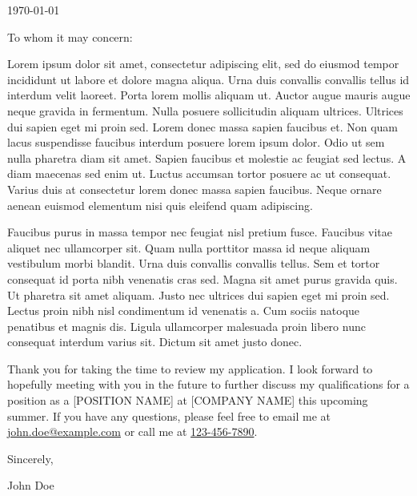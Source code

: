 \documentclass{ExpressiveCoverLetter}
\begin{document}
\coverletterheader[
    firstname=John,
    middleinitial=N,
    lastname=Doe,
    email=john.doe@example.com,
    phone=123-456-7890,
    linkedin=risanraja,
    github=risan-raja,
    city=Town,
    state=State
]

\vspace{0.25in}
\today
\vspace{0.15in}


To whom it may concern:

Lorem ipsum dolor sit amet, consectetur adipiscing elit, sed do eiusmod
tempor incididunt ut labore et dolore magna aliqua. Urna duis convallis
convallis tellus id interdum velit laoreet. Porta lorem mollis aliquam
ut. Auctor augue mauris augue neque gravida in fermentum. Nulla posuere
sollicitudin aliquam ultrices. Ultrices dui sapien eget mi proin sed.
Lorem donec massa sapien faucibus et. Non quam lacus suspendisse
faucibus interdum posuere lorem ipsum dolor. Odio ut sem nulla pharetra
diam sit amet. Sapien faucibus et molestie ac feugiat sed lectus. A
diam maecenas sed enim ut. Luctus accumsan tortor posuere ac ut
consequat. Varius duis at consectetur lorem donec massa sapien
faucibus. Neque ornare aenean euismod elementum nisi quis eleifend quam
adipiscing.

Faucibus purus in massa tempor nec feugiat nisl pretium fusce. Faucibus
vitae aliquet nec ullamcorper sit. Quam nulla porttitor massa id neque
aliquam vestibulum morbi blandit. Urna duis convallis convallis tellus.
Sem et tortor consequat id porta nibh venenatis cras sed. Magna sit
amet purus gravida quis. Ut pharetra sit amet aliquam. Justo nec
ultrices dui sapien eget mi proin sed. Lectus proin nibh nisl
condimentum id venenatis a. Cum sociis natoque penatibus et magnis dis.
Ligula ullamcorper malesuada proin libero nunc consequat interdum
varius sit. Dictum sit amet justo donec.

Thank you for taking the time to review my application. I look forward
to hopefully meeting with you in the future to further discuss my
qualifications for a position as a [POSITION NAME] at [COMPANY NAME]
this upcoming summer. If you have any questions, please feel free to
email me at \href{mailto:john.doe@example.com}{john.doe@example.com} or
call me at \href{tel:+1-123-456-7890}{123-456-7890}.

Sincerely,

\vspace{.15in}

John Doe
\end{document}
